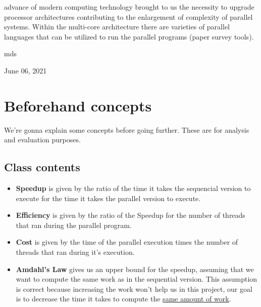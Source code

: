 \documentclass[10pt,journal,compsoc]{IEEEtran}
\begin{document}
\maketitle

\IEEEdisplaynontitleabstractindextext

\IEEEpeerreviewmaketitle



 advance of modern computing technology brought to us the necessity to upgrade processor architectures contributing to the enlargement of complexity of parallel systems. Within the multi-core architecture there are varieties of parallel languages that can be utilized to run the parallel programs (paper survey tools).


\hfill mds
 
\hfill June 06, 2021


\section{Beforehand concepts}
We're gonna explain some concepts before going further. These are for analysis and evaluation purposes.

\subsection{Class contents}
\begin{itemize}
    \item \textbf{Speedup} is given by the ratio of the time it takes the sequencial version to execute for the time it takes the parallel version to execute.
    \item \textbf{Efficiency} is given by the ratio of the Speedup for the number of threads that ran during the parallel program.
    \item \textbf{Cost} is given by the time of the parallel execution times the number of threads that ran during it's execution.
    \item \textbf{Amdahl's Law} gives us an upper bound for the speedup, assuming that we want to compute the same work as in the sequential version. This assumption is correct because increasing the work won't help us in this project, our goal is to decrease the time it takes to compute the \underline{same amount of work}.
\end{itemize}
\end{document}
